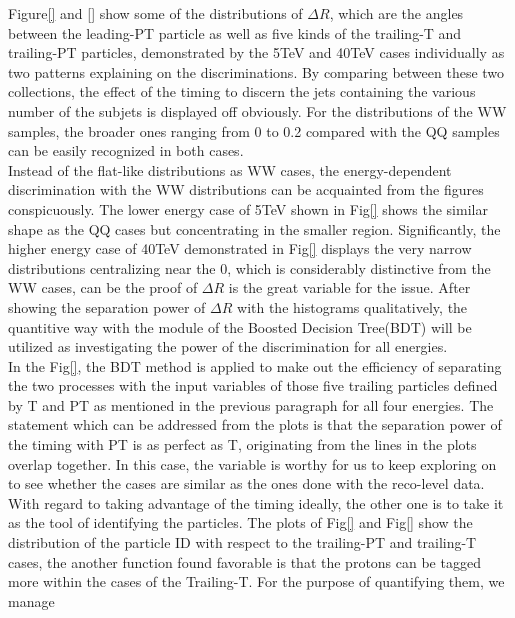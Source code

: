 Figure\ref{} and \ref{} show some of the distributions of $\Delta R$, which are the angles between the leading-PT particle as well as five kinds of the trailing-T and trailing-PT particles, demonstrated by the 5TeV and 40TeV cases individually as two patterns explaining on the discriminations. By comparing between these two collections, the effect of the timing to discern the jets containing the various number of the subjets is displayed off obviously. For the distributions of the WW samples, the broader ones ranging from 0 to 0.2 compared with the QQ samples can be easily recognized in both cases.\\

Instead of the flat-like distributions as WW cases, the energy-dependent discrimination with the WW distributions can be acquainted from the figures conspicuously. The lower energy case of 5TeV shown in Fig\ref{} shows the similar shape as the QQ cases but concentrating in the smaller region. Significantly, the higher energy case of 40TeV demonstrated in Fig\ref{} displays the very narrow distributions centralizing near the 0, which is considerably distinctive from the WW cases, can be the proof of $\Delta R$ is the great variable for the issue. After showing the separation power of $\Delta R$ with the histograms qualitatively, the quantitive way with the module of the Boosted Decision Tree(BDT) will be utilized as investigating the power of the discrimination for all energies.\\

In the Fig\ref{}, the BDT method is applied to make out the efficiency of separating the two processes with the input variables of those five trailing particles defined by T and PT as mentioned in the previous paragraph for all four energies. The statement which can be addressed from the plots is that the separation power of the timing with PT is as perfect as T, originating from the lines in the plots overlap together. In this case, the variable is worthy for us to keep exploring on to see whether the cases are similar as the ones done with the reco-level data.\\

With regard to taking advantage of the timing ideally, the other one is to take it as the tool of identifying the particles. The plots of Fig\ref{} and Fig\ref{} show the distribution of the particle ID with respect to the trailing-PT and trailing-T cases, the another function found favorable is that the protons can be tagged more within the cases of the Trailing-T. For the purpose of quantifying them, we manage 


